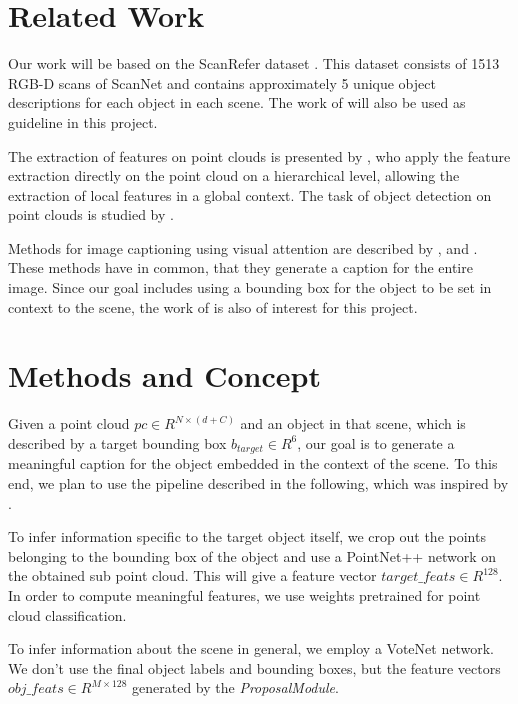 \documentclass[10pt,twocolumn,letterpaper]{article}
\begin{document}
\section{Related Work}
Our work will be based on the ScanRefer dataset \cite{Chen2019}. This dataset consists of 1513 RGB-D scans of ScanNet \cite{Dai2017} and contains approximately 5 unique object descriptions for each object in each scene. The work of \cite{Chen2019} will also be used as guideline in this project.

The extraction of features on point clouds is presented by \cite{Qi2017}, who apply the feature extraction directly on the point cloud on a hierarchical level, allowing the extraction of local features in a global context. 
The task of object detection on point clouds is studied by \cite{Qi2019}. 

Methods for image captioning using visual attention are described by \cite{Xu2015}, \cite{Lu2016} and \cite{Anderson2017}.
These methods have in common, that they generate a caption for the entire image.
Since our goal includes using a bounding box for the object to be set in context to the scene, the work of \cite{Rohrbach2015} is also of interest for this project. 

\section{Methods and Concept}

Given a point cloud $\mathit{pc \in R^{N\times(d+C)}}$ and an object in that scene, which is described by a target bounding box $b_{target}\in R^6$, our goal is to generate a meaningful caption for the object embedded in the context of the scene. To this end, we plan to use the pipeline described in the following, which was inspired by \cite{Anderson2017}.

To infer information specific to the target object itself, we crop out the points belonging to the bounding box of the object and use a PointNet++ \cite{Qi2017} network on the obtained sub point cloud. This will give a feature vector $\mathit{target\_feats}\in R^{128}$. In order to compute meaningful features, we use weights pretrained for point cloud classification.

To infer information about the scene in general, we employ a VoteNet \cite{Qi2019} network. We don't use the final object labels and bounding boxes, but the feature vectors $\mathit{obj\_feats}\in R^{M\times128}$ generated by the \textit{ProposalModule}.
\end{document}
